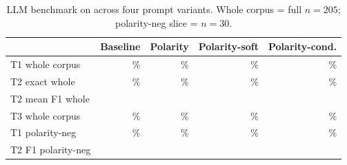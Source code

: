 \begin{table}[t]
\centering
\caption{LLM benchmark on \statBenchmarkLlmModel{} across four prompt
variants. Whole corpus = full $n=205$; polarity-neg slice = $n=30$.}
\label{tab:llm-benchmark}
\begin{tabular}{lrrrr}
\hline
& \textbf{Baseline} & \textbf{Polarity} & \textbf{Polarity-soft} & \textbf{Polarity-cond.} \\
\hline
T1 whole corpus      & \statBenchmarkLlmTone{}\%
                     & \statBenchmarkLlmPolTone{}\%
                     & \statBenchmarkLlmSoftTone{}\%
                     & \statBenchmarkLlmCondTone{}\% \\
T2 exact whole       & \statBenchmarkLlmTtwo{}\%
                     & \statBenchmarkLlmPolTtwo{}\%
                     & \statBenchmarkLlmSoftTtwo{}\%
                     & \statBenchmarkLlmCondTtwo{}\% \\
T2 mean F1 whole     & \statBenchmarkLlmTtwoFOne{}
                     & \statBenchmarkLlmPolTtwoFOne{}
                     & \statBenchmarkLlmSoftTtwoFOne{}
                     & \statBenchmarkLlmCondTtwoFOne{} \\
T3 whole corpus      & \statBenchmarkLlmTthree{}\%
                     & \statBenchmarkLlmPolTthree{}\%
                     & \statBenchmarkLlmSoftTthree{}\%
                     & \statBenchmarkLlmCondTthree{}\% \\
T1 polarity-neg      & \statBenchmarkLlmNegPolarTone{}\%
                     & \statBenchmarkLlmPolNegPolarTone{}\%
                     & \statBenchmarkLlmSoftNegPolarTone{}\%
                     & \statBenchmarkLlmCondNegPolarTone{}\% \\
T2 F1 polarity-neg   & \statBenchmarkLlmNegPolarFOne{}
                     & \statBenchmarkLlmPolNegPolarFOne{}
                     & \statBenchmarkLlmSoftNegPolarFOne{}
                     & \statBenchmarkLlmCondNegPolarFOne{} \\
\hline
\end{tabular}
\end{table}

